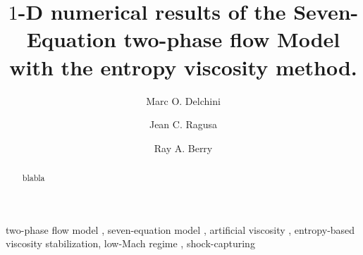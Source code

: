 \documentclass[preprint,10pt]{elsarticle}
\begin{document}
\begin{frontmatter}


\title{$1$-D numerical results of the Seven-Equation two-phase flow Model with the entropy viscosity method.}
\author{Marc O. Delchini}

\author{Jean C. Ragusa}

\author{Ray A. Berry}

\address[label1]{Department of Nuclear Engineering, Texas A\&M University, College Station, TX 77843, USA }

\address[label2]{Idaho National Laboratory, Idaho Falls, ID 83415, USA }

\begin{abstract}
blabla
\end{abstract}
\begin{keyword}
  two-phase flow model \sep 
	seven-equation model \sep
	artificial viscosity \sep 
	entropy-based viscosity stabilization\sep 
	low-Mach regime \sep 
	shock-capturing
\end{keyword}
\end{frontmatter}
\linenumbers

\end{document}
